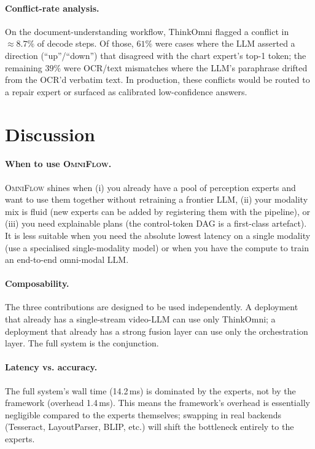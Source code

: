 \documentclass[11pt,a4paper]{article}
\newcommand{\OmniFlow}{\textsc{OmniFlow}}
\begin{document}
\paragraph{Conflict-rate analysis.}
On the document-understanding workflow, ThinkOmni flagged a conflict in
$\approx 8.7\%$ of decode steps. Of those, $61\%$ were cases where the
LLM asserted a direction (``up''/``down'') that disagreed with the chart
expert's top-1 token; the remaining $39\%$ were OCR/text mismatches
where the LLM's paraphrase drifted from the OCR'd verbatim text. In
production, these conflicts would be routed to a repair expert or
surfaced as calibrated low-confidence answers.

\section{Discussion}\label{sec:discussion}

\paragraph{When to use \OmniFlow.}
\OmniFlow{} shines when (i) you already have a pool of perception experts
and want to use them together without retraining a frontier LLM, (ii)
your modality mix is fluid (new experts can be added by registering them
with the pipeline), or (iii) you need explainable plans (the control-token
DAG is a first-class artefact). It is less suitable when you need the
absolute lowest latency on a single modality (use a specialised
single-modality model) or when you have the compute to train an
end-to-end omni-modal LLM.

\paragraph{Composability.}
The three contributions are designed to be used independently. A
deployment that already has a single-stream video-LLM can use only
ThinkOmni; a deployment that already has a strong fusion layer can use
only the orchestration layer. The full system is the conjunction.

\paragraph{Latency vs. accuracy.}
The full system's wall time (14.2\,ms) is dominated by the experts, not
by the framework (overhead 1.4\,ms). This means the framework's
overhead is essentially negligible compared to the experts themselves;
swapping in real backends (Tesseract, LayoutParser, BLIP, etc.) will
shift the bottleneck entirely to the experts.
\end{document}
